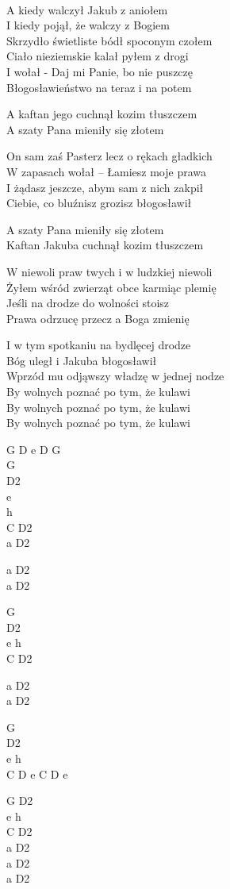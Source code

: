 \begin{text}
    \chordfill\\
    A kiedy walczył Jakub z aniołem\\
    I kiedy pojął, że walczy z Bogiem\\
    Skrzydło świetliste bódł spoconym czołem\\
    Ciało nieziemskie kalał pyłem z drogi\\
    I wołał - Daj mi Panie, bo nie puszczę\\
    Błogosławieństwo na teraz i na potem

    A kaftan jego cuchnął kozim tłuszczem\\
    A szaty Pana mieniły się złotem

    On sam zaś Pasterz lecz o rękach gładkich\\
    W zapasach wołał – Łamiesz moje prawa\\
    I żądasz jeszcze, abym sam z nich zakpił\\
    Ciebie, co bluźnisz grozisz błogosławił

    A szaty Pana mieniły się złotem\\
    Kaftan Jakuba cuchnął kozim tłuszczem

    W niewoli praw twych i w ludzkiej niewoli\\
    Żyłem wśród zwierząt obce karmiąc plemię\\
    Jeśli na drodze do wolności stoisz\\
    Prawa odrzucę przecz a Boga zmienię

    I w tym spotkaniu na bydlęcej drodze\\
    Bóg uległ i Jakuba błogosławił\\
    Wprzód mu odjąwszy władzę w jednej nodze\\
    By wolnych poznać po tym, że kulawi\\
    By wolnych poznać po tym, że kulawi\\
    By wolnych poznać po tym, że kulawi
\end{text}
\begin{chord}
    G D e D G\\
    G\\
    D2\\
    e\\
    h\\
    C D2\\
    a D2

    a D2\\
    a D2

    G\\
    D2\\
    e h\\
    C D2

    a D2\\
    a D2

    G\\
    D2\\
    e h\\
    C D e C D e

    G D2\\
    e h\\
    C D2\\
    a D2\\
    a D2\\
    a D2
\end{chord}